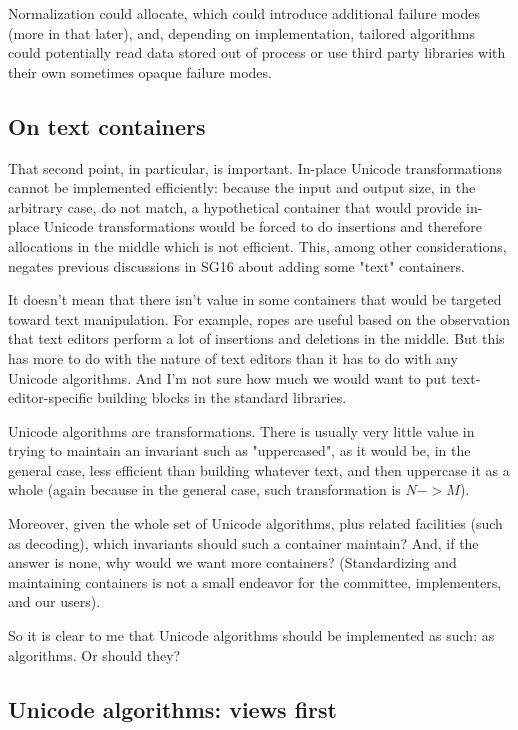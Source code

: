 \documentclass{wg21}
\begin{document}
Normalization could allocate, which could introduce additional failure modes
(more in that later), and, depending on implementation, tailored algorithms could potentially read data stored out of process or use third party libraries with their own sometimes opaque failure modes.

\subsection{On text containers}

That second point, in particular, is important. In-place Unicode transformations cannot be implemented efficiently: because the input and output size, in the arbitrary case, do not match, a hypothetical container that would provide in-place Unicode transformations would be forced to do insertions and therefore allocations in the middle which is not efficient. This, among other considerations, negates previous discussions in SG16 about adding some "text" containers.

It doesn't mean that there isn't value in some containers that would be targeted toward text manipulation. For example, ropes are useful based on the observation
that text editors perform a lot of insertions and deletions in the middle. But this has more to do with the nature of text editors than it has to do with any Unicode algorithms. And I'm not sure how much we would want to put text-editor-specific building blocks in the standard libraries.

Unicode algorithms are transformations. There is usually very little value in trying to maintain an invariant such as "uppercased", as it would be, in the general case, less efficient than building whatever text, and then uppercase it as a whole (again because in the general case, such transformation is $N->M$).

Moreover, given the whole set of Unicode algorithms, plus related facilities (such as decoding), which invariants should such a container maintain?
And, if the answer is none, why would we want more containers? (Standardizing and maintaining containers is not a small endeavor for the committee, implementers, and our users).

So it is clear to me that Unicode algorithms should be implemented as such: as algorithms.
Or should they?

\subsection{Unicode algorithms: views first}
\end{document}
